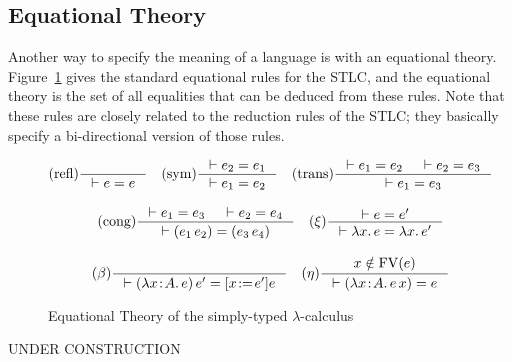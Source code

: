 \documentclass{tufte-handout}
\newcommand{\LAM}[1]{\lambda #1.\,}
\newcommand{\APP}[0]{\,}
\newcommand{\of}[0]{\!:\!}
\newcommand{\by}[0]{\!:=\!}
\begin{document}
\subsection{Equational Theory}


Another way to specify the meaning of a language is with an equational
theory. Figure~\ref{fig:stlc-eqns} gives the standard equational rules
for the STLC, and the equational theory is the set of all equalities
that can be deduced from these rules.  Note that these rules are
closely related to the reduction rules of the STLC; they basically
specify a bi-directional version of those rules.

\begin{figure}[tbp]
\begin{gather*}
  \text{(refl)}
  \inference{}{\vdash e = e}
  \quad
  \text{(sym)}
  \inference{\vdash e_2 = e_1}{\vdash e_1 = e_2}
  \quad
  \text{(trans)}
  \inference{\vdash e_1 = e_2 & \vdash e_2 = e_3}{\vdash e_1 = e_3}  
  \\[2ex]
  \text{(cong)}
  \inference{\vdash e_1 = e_3 & \vdash e_2 = e_4}
    {\vdash (e_1\APP e_2) = (e_3 \APP e_4)}
  \quad
  (\xi)\inference{\vdash e = e'}{\vdash \LAM{x}e = \LAM{x}e'}
  \\[2ex]
  (\beta) \inference{}{\vdash (\LAM{x\of A}e)\APP e' = [x\by e']e}
  \quad
  (\eta) \inference{x \notin \mathrm{FV}(e)}
      {\vdash (\LAM{x\of A} e \APP x) = e}
\end{gather*}
\caption{Equational Theory of the simply-typed $\lambda$-calculus}
\label{fig:stlc-eqns}
\end{figure}

UNDER CONSTRUCTION
\end{document}
